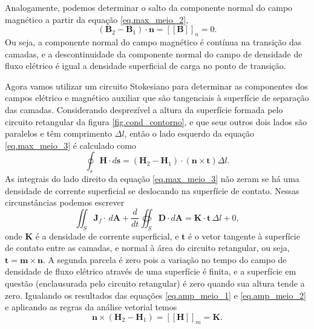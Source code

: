 Analogamente, podemos determinar o salto da componente normal do campo magn\'etico a partir da equa\c{c}\~ao \ref{eq.max_meio_2},
\begin{equation*}
(\mathbf{B}_2-\mathbf{B}_1)\cdot\mathbf{n}=\left[\left[\mathbf{B}\right]\right]_n=0.
\end{equation*}  
Ou seja, a componente normal do campo magn\'etico \'e cont\'inua na transi\c{c}\~ao das camadas, e a descontinuidade da componente normal do campo de densidade de fluxo el\'etrico \'e igual a densidade superficial de carga no ponto de transi\c{c}\~ao.

Agora vamos utilizar um circuito Stokesiano para determinar as componentes dos campos el\'etrico e magn\'etico auxiliar que s\~ao tangenciais \`a superf\'icie de separa\c{c}\~ao das camadas. Considerando desprez\'ivel a altura da superf\'icie formada pelo circuito retangular da figura \ref{fig.cond_contorno}, e que seus outros dois lados s\~ao paralelos e t\^em comprimento $\Delta l$, ent\~ao o lado esquerdo da equa\c{c}\~ao \ref{eq.max_meio_3} \'e calculado como
\begin{equation}\label{eq.amp_meio_1}
\oint_s\mathbf{H}\cdot d\mathbf{s}=(\mathbf{H}_2-\mathbf{H}_1)\cdot(\mathbf{n}\times\mathbf{t})\Delta l.
\end{equation}
As integrais do lado direito da equa\c{c}\~ao \ref{eq.max_meio_3} n\~ao zeram se h\'a uma densidade de corrente superficial se deslocando na superf\'icie de contato. Nessas circunst\^ancias podemos escrever
\begin{equation}\label{eq.amp_meio_2}
\iint_S\mathbf{J}_f\cdot\,d\mathbf{A}+\frac{d}{dt}\oiint_S\mathbf{D}\cdot\textit{d}\textbf{A}=\mathbf{K}\cdot\mathbf{t}\,\Delta l+0,
\end{equation}
onde $\mathbf{K}$ \'e a densidade de corrente superficial, e $\mathbf{t}$ \'e o vetor tangente \`a superf\'icie de contato entre as camadas, e normal \`a \'area do circuito retangular, ou seja, $\mathbf{t}=\mathbf{m}\times\mathbf{n}$. A segunda parcela \'e zero pois a varia\c{c}\~ao no tempo do campo de densidade de fluxo el\'etrico atrav\'es de uma superf\'icie \'e finita, e a superf\'icie em quest\~ao (enclausurada pelo circuito retangular) \'e zero quando sua altura tende a zero. Igualando os resultados das equa\c{c}\~oes \ref{eq.amp_meio_1} e \ref{eq.amp_meio_2} e aplicando as regras da an\'alise vetorial temos
\begin{equation}\label{eq.far_meio_1}
\mathbf{n}\times(\mathbf{H}_2-\mathbf{H}_1)=\left[\left[\mathbf{H}\right]\right]_m=\mathbf{K}.
\end{equation}
